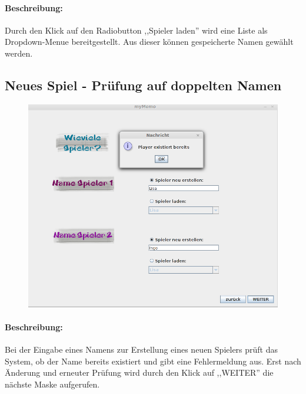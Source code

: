 \paragraph{Beschreibung: }Durch den Klick auf den Radiobutton ,,Spieler laden'' wird eine Liste als Dropdown-Menue bereitgestellt. Aus dieser können gespeicherte Namen gewählt werden.


\clearpage
\subsection{Neues Spiel - Prüfung auf doppelten Namen}
\begin{figure}[!h]
	\centering
    \includegraphics[width=\textwidth]{./guiSpielerError.png}
	\label{}
\end{figure}
\paragraph{Beschreibung: }Bei der Eingabe eines Namens zur Erstellung eines neuen Spielers prüft das System, ob der Name bereits existiert und gibt eine Fehlermeldung aus. Erst nach Änderung und erneuter Prüfung wird durch den Klick auf ,,WEITER'' die nächste Maske aufgerufen.

\clearpage
